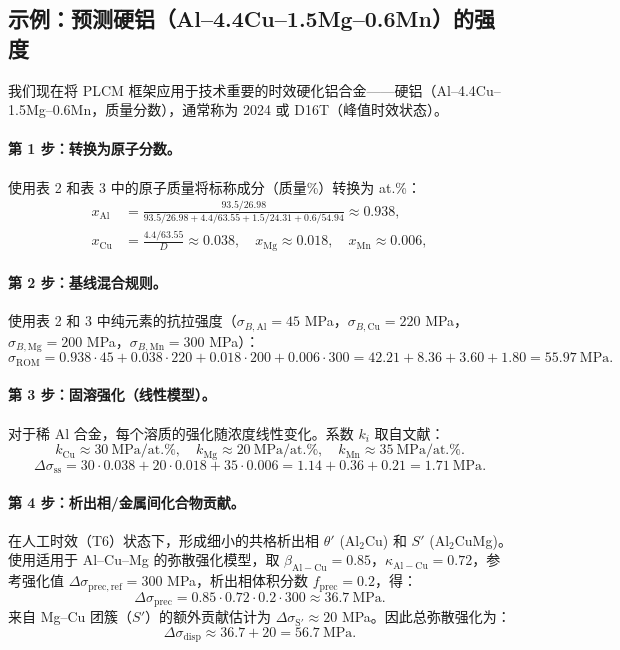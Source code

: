 \documentclass[12pt,a4paper]{article}
\begin{document}
	\subsection{示例：预测硬铝（Al–4.4Cu–1.5Mg–0.6Mn）的强度}
	\label{subsec:example-duralumin}
	
	我们现在将 PLCM 框架应用于技术重要的时效硬化铝合金——硬铝（Al–4.4Cu–1.5Mg–0.6Mn，质量分数），通常称为 2024 或 D16T（峰值时效状态）。
	
	\paragraph{第 1 步：转换为原子分数。}
	使用表 2 和表 3 中的原子质量将标称成分（质量\%）转换为 at.\%：
	\[
	\begin{aligned}
		x_{\mathrm{Al}} &= \frac{93.5/26.98}{93.5/26.98+4.4/63.55+1.5/24.31+0.6/54.94} \approx 0.938,\\
		x_{\mathrm{Cu}} &= \frac{4.4/63.55}{D} \approx 0.038,\quad
		x_{\mathrm{Mg}} \approx 0.018,\quad
		x_{\mathrm{Mn}} \approx 0.006,
	\end{aligned}
	\]
	
	\paragraph{第 2 步：基线混合规则。}
	使用表 2 和 3 中纯元素的抗拉强度（\(\sigma_{B,\mathrm{Al}}=45\) MPa，\(\sigma_{B,\mathrm{Cu}}=220\) MPa，\(\sigma_{B,\mathrm{Mg}}=200\) MPa，\(\sigma_{B,\mathrm{Mn}}=300\) MPa）：
	\[
	\sigma_{\mathrm{ROM}} = 0.938\cdot45 + 0.038\cdot220 + 0.018\cdot200 + 0.006\cdot300
	= 42.21 + 8.36 + 3.60 + 1.80 = 55.97\ \text{MPa}.
	\]
	
	\paragraph{第 3 步：固溶强化（线性模型）。}
	对于稀 Al 合金，每个溶质的强化随浓度线性变化。系数 \(k_i\) 取自文献：
	\[
	k_{\mathrm{Cu}} \approx 30\ \text{MPa/at.\%},\quad
	k_{\mathrm{Mg}} \approx 20\ \text{MPa/at.\%},\quad
	k_{\mathrm{Mn}} \approx 35\ \text{MPa/at.\%}.
	\]
	\[
	\Delta\sigma_{\mathrm{ss}} = 30\cdot0.038 + 20\cdot0.018 + 35\cdot0.006
	= 1.14 + 0.36 + 0.21 = 1.71\ \text{MPa}.
	\]
	
	\paragraph{第 4 步：析出相/金属间化合物贡献。}
	在人工时效（T6）状态下，形成细小的共格析出相 \(\theta'\) (Al\(_2\)Cu) 和 \(S'\) (Al\(_2\)CuMg)。使用适用于 Al–Cu–Mg 的弥散强化模型，取 \(\beta_{\mathrm{Al-Cu}}=0.85\)，\(\kappa_{\mathrm{Al-Cu}}=0.72\)，参考强化值 \(\Delta\sigma_{\mathrm{prec,ref}}=300\) MPa，析出相体积分数 \(f_{\mathrm{prec}}=0.2\)，得：
	\[
	\Delta\sigma_{\mathrm{prec}} = 0.85\cdot0.72\cdot0.2\cdot300 \approx 36.7\ \text{MPa}.
	\]
	来自 Mg–Cu 团簇（\(S'\)）的额外贡献估计为 \(\Delta\sigma_{\mathrm{S'}} \approx 20\) MPa。因此总弥散强化为：
	\[
	\Delta\sigma_{\mathrm{disp}} \approx 36.7 + 20 = 56.7\ \text{MPa}.
	\]
	
\end{document}
